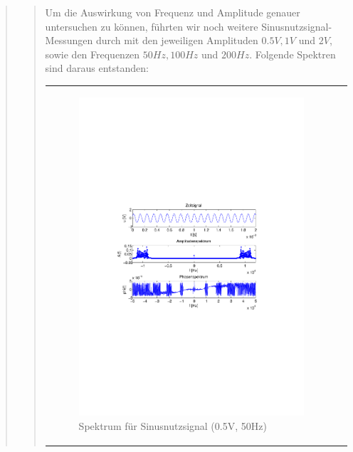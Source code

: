 \begin{quote}
\begin{quote}
        Um die Auswirkung von Frequenz und Amplitude genauer untersuchen zu
        können, führten wir noch weitere Sinusnutzsignal-Messungen durch mit den
        jeweiligen Amplituden $0.5V, 1V$ und $2V$, sowie den Frequenzen $50Hz,
        100Hz$ und $200Hz$. Folgende Spektren sind daraus entstanden:
        
               \begin{center}
            \begin{tabular}{ll}

            \hspace{-10em}
                \begin{minipage}{0.6\textwidth}

                    \begin{figure}[H]
                        \label{fig:}
                        \includegraphics[scale=0.5, trim = 4cm 9.5cm 3.5cm
                        9.5cm, clip]{./Bilder/sin_a05_f50}
                        \caption{Spektrum für Sinusnutzsignal (0.5V, 50Hz)}
                    \end{figure}


\end{minipage}
\end{tabular}
\end{center}
\end{quote}
\end{quote}
